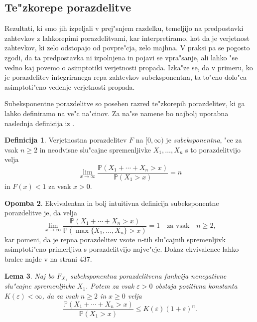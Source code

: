 \documentclass[12pt, a4paper, reqno]{amsart}
\theoremstyle{definition}
\newtheorem{definicija}{Definicija}[section]
\newtheorem{opomba}[definicija]{Opomba}
\theoremstyle{plain}
\newtheorem{lema}[definicija]{Lema}
\newcommand{\Prob}{\mathbb{P}}
\newcommand{\1}{\mathds{1}}
\begin{document}
        
    \subsection{Te"zkorepe porazdelitve}
        Rezultati, ki smo jih izpeljali v prej"snjem razdelku, temeljijo na predpostavki zahtevkov
        z lahkorepimi porazdelitvami, kar interpretiramo, kot da je verjetnost zahtevkov, ki zelo 
        odstopajo od povpre"cja, zelo majhna. V praksi pa se pogosto zgodi, da ta predpostavka ni 
        izpolnjena in pojavi se vpra"sanje, ali lahko "se vedno kaj povemo o asimptotiki verjetnosti 
        propada. Izka"ze se, da v primeru, ko je porazdelitev 
        integriranega repa zahtevkov subeksponentna, ta to"cno dolo"ca asimptoti"cno vedenje verjetnosti 
        propada. 

        Subeksponentne porazdelitve so poseben razred te"zkorepih porazdelitev, ki ga lahko definiramo na 
        ve"c na"cinov. Za na"se namene bo najbolj uporabna naslednja definicija iz \cite{9}.
        \begin{definicija}
            Verjetnostna porazdelitev $F$ na $[0, \infty)$ je \textit{subeksponentna}, "ce za vsak $n\geq2$ in 
            neodvisne slu"cajne spremenljivke $X_1, \dots, X_n$ s to porazdelitvijo velja 
            \begin{equation*}
                \lim_{x\to\infty}\frac{\Prob\left(X_1 + \cdots + X_n > x\right)}{\Prob\left(X_1 > x\right)} = n
            \end{equation*}
            in $F(x) < 1$ za vsak $x > 0$.
            \label{def:subeksponentnaPorazdelitev}
        \end{definicija}

        \begin{opomba}
            Ekvivalentna in bolj intuitivna definicija subeksponentne porazdelitve je, da velja 
            \begin{equation*}
                \lim_{x\to\infty}\frac{\Prob\left(X_1 + \cdots + X_n > x\right)}{\Prob\left(\max\{X_1, \dots, X_n\} > x\right)} = 1 \quad \text{za vsak} \quad n\geq2, 
            \end{equation*}
            kar pomeni, da je repna porazdelitev vsote $n$-tih slu"cajnih spremenljivk asimptoti"cno
            primerljiva s porazdelitvijo najve"cje. Dokaz ekvivalence lahko bralec najde v \cite{9} na strani $437$.
        \end{opomba}

        \begin{lema}
            Naj bo $F_{X_1}$ subeksponentna porazdelitvena funkcija nenegativne slu"cajne spremenljivke 
            $X_1$. Potem za vsak $\varepsilon > 0$ obstaja pozitivna konstanta $K(\varepsilon) < \infty$, 
            da za vsak $n\geq2$ in $x \geq 0$ velja 
            \begin{equation*}
                \frac{\Prob(X_1 + \cdots + X_n > x)}{\Prob(X_1 > x)} \leq K(\varepsilon)(1+\varepsilon)^n. 
            \end{equation*} 
            \label{lema:ocenaSubeksponentnePorazdelitve}
        \end{lema}
\end{document}
